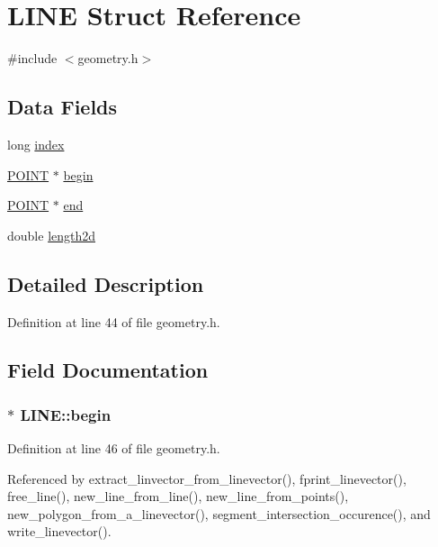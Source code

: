 \hypertarget{struct_l_i_n_e}{\section{L\-I\-N\-E Struct Reference}
\label{struct_l_i_n_e}
}


{\ttfamily \#include $<$geometry.\-h$>$}

\subsection*{Data Fields}
\begin{DoxyCompactItemize}
\item 
long \hyperlink{struct_l_i_n_e_a56bdc56652205abd8ad81c4fb93ca6fa}{index}
\item 
\hyperlink{struct_p_o_i_n_t}{P\-O\-I\-N\-T} $\ast$ \hyperlink{struct_l_i_n_e_ab5f47ed163e04479e59c53205aac6c31}{begin}
\item 
\hyperlink{struct_p_o_i_n_t}{P\-O\-I\-N\-T} $\ast$ \hyperlink{struct_l_i_n_e_a3820efbf1f1c9bde33fdf1b357ea6a85}{end}
\item 
double \hyperlink{struct_l_i_n_e_a3acc8ea260ffea00fa61bbfd233d01bf}{length2d}
\end{DoxyCompactItemize}


\subsection{Detailed Description}


Definition at line 44 of file geometry.\-h.



\subsection{Field Documentation}
\hypertarget{struct_l_i_n_e_ab5f47ed163e04479e59c53205aac6c31}{
\subsubsection[{begin}]{$\ast$ L\-I\-N\-E\-::begin}}\label{struct_l_i_n_e_ab5f47ed163e04479e59c53205aac6c31}


Definition at line 46 of file geometry.\-h.



Referenced by extract\-\_\-linvector\-\_\-from\-\_\-linevector(), fprint\-\_\-linevector(), free\-\_\-line(), new\-\_\-line\-\_\-from\-\_\-line(), new\-\_\-line\-\_\-from\-\_\-points(), new\-\_\-polygon\-\_\-from\-\_\-a\-\_\-linevector(), segment\-\_\-intersection\-\_\-occurence(), and write\-\_\-linevector().

